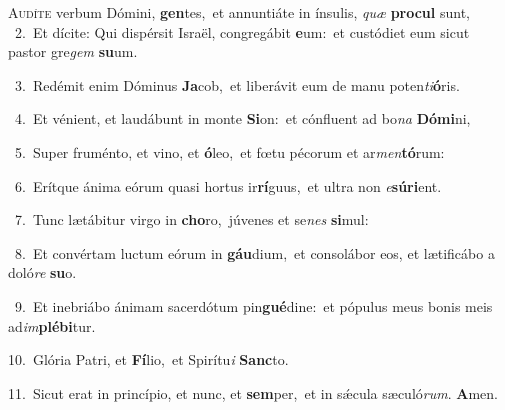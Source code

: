 \lettrine{\initial\textcolor{\initialcolor}{A}}{udíte} verbum Dómini, \textbf{gen}\-tes,~\star et annuntiáte in ínsulis, \textit{quæ} \textbf{pro}\-\textbf{cul} sunt,\\
{\numbfont\textcolor{\numbcolor}{~2.}}~Et dícite: Qui dispérsit Israël, congregábit \textbf{e}\-um:~\star et custódiet eum sicut pastor gre\textit{gem} \textbf{su}\-um.\par
{\numbfont\textcolor{\numbcolor}{~3.}}~Redémit enim Dóminus \textbf{Ja}\-cob,~\star et liberávit eum de manu poten\-\textit{ti}\-\textbf{ó}ris.\par
{\numbfont\textcolor{\numbcolor}{~4.}}~Et vénient, et laudábunt in monte \textbf{Si}\-on:~\star et cónfluent ad bo\textit{na} \textbf{Dó}\-\textbf{mi}ni,\par
{\numbfont\textcolor{\numbcolor}{~5.}}~Super fruménto, et vino, et \textbf{ó}\-leo,~\star et fœtu pécorum et ar\-\textit{men}\-\textbf{tó}rum:\par
{\numbfont\textcolor{\numbcolor}{~6.}}~Erítque ánima eórum quasi hortus ir\-\textbf{rí}\-guus,~\star et ultra non \textit{e}\-\textbf{sú}\textbf{ri}ent.\par
{\numbfont\textcolor{\numbcolor}{~7.}}~Tunc lætábitur virgo in \textbf{cho}\-ro,~\star júvenes et se\textit{nes} \textbf{si}\-mul:\par
{\numbfont\textcolor{\numbcolor}{~8.}}~Et convértam luctum eórum in \textbf{gáu}\-dium,~\star et consolábor eos, et lætificábo a doló\textit{re} \textbf{su}\-o.\par
{\numbfont\textcolor{\numbcolor}{~9.}}~Et inebriábo ánimam sacerdótum pin\-\textbf{gué}\-dine:~\star et pópulus meus bonis meis ad\-\textit{im}\-\textbf{plé}\textbf{bi}tur.\par
{\numbfont\textcolor{\numbcolor}{10.}}~Glória Patri, et \textbf{Fí}\-lio,~\star et Spirítu\textit{i} \textbf{Sanc}\-to.\par
{\numbfont\textcolor{\numbcolor}{11.}}~Sicut erat in princípio, et nunc, et \textbf{sem}\-per,~\star et in sǽcula sæculó\-\textit{rum}\-. \textbf{A}\-men.\par

